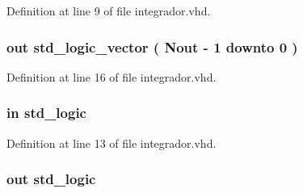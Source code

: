 Definition at line 9 of file integrador.\+vhd.

\hypertarget{classintegrador_a9e461894ea9b864637648799f51bf9be}{}
\subsubsection[{out\+\_\+data}]{ {\bfseries \textcolor{keywordflow}{out}\textcolor{vhdlchar}{ }} {\bfseries \textcolor{comment}{std\+\_\+logic\+\_\+vector}\textcolor{vhdlchar}{ }\textcolor{vhdlchar}{(}\textcolor{vhdlchar}{ }\textcolor{vhdlchar}{ }\textcolor{vhdlchar}{ }\textcolor{vhdlchar}{ }{\bfseries {\bf Nout}} \textcolor{vhdlchar}{-\/}\textcolor{vhdlchar}{ } \textcolor{vhdldigit}{1} \textcolor{vhdlchar}{ }\textcolor{keywordflow}{downto}\textcolor{vhdlchar}{ }\textcolor{vhdlchar}{ } \textcolor{vhdldigit}{0} \textcolor{vhdlchar}{ }\textcolor{vhdlchar}{)}\textcolor{vhdlchar}{ }} \hspace{0.3cm}{\ttfamily [Port]}}\label{classintegrador_a9e461894ea9b864637648799f51bf9be}


Definition at line 16 of file integrador.\+vhd.

\hypertarget{classintegrador_aad8dc6359d9e23dabcbf342fadf2fa06}{}
\subsubsection[{reset}]{ {\bfseries \textcolor{keywordflow}{in}\textcolor{vhdlchar}{ }} {\bfseries \textcolor{comment}{std\+\_\+logic}\textcolor{vhdlchar}{ }} \hspace{0.3cm}{\ttfamily [Port]}}\label{classintegrador_aad8dc6359d9e23dabcbf342fadf2fa06}


Definition at line 13 of file integrador.\+vhd.

\hypertarget{classintegrador_aae281cf725515894f893258c629a59c7}{}
\subsubsection[{sinc}]{ {\bfseries \textcolor{keywordflow}{out}\textcolor{vhdlchar}{ }} {\bfseries \textcolor{comment}{std\+\_\+logic}\textcolor{vhdlchar}{ }} \hspace{0.3cm}{\ttfamily [Port]}}\label{classintegrador_aae281cf725515894f893258c629a59c7}


